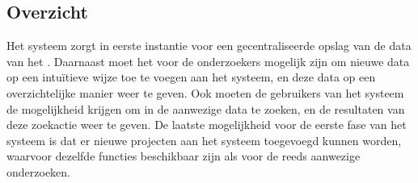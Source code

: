 \subsection{Overzicht}
\label{overzicht}

Het systeem zorgt in eerste instantie voor een gecentraliseerde opslag van de data van het \casamproject.
Daarnaast moet het voor de onderzoekers mogelijk zijn om nieuwe data op een intu\"itieve wijze toe te voegen aan het systeem, en deze data op een overzichtelijke manier weer te geven.
Ook moeten de gebruikers van het systeem de mogelijkheid krijgen om in de aanwezige data te zoeken, en de resultaten van deze zoekactie weer te geven.
De laatste mogelijkheid voor de eerste fase van het systeem is dat er nieuwe projecten aan het systeem toegevoegd kunnen worden, waarvoor dezelfde functies beschikbaar zijn als voor de reeds aanwezige onderzoeken.
